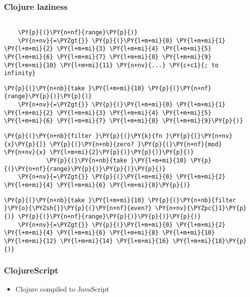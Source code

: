 \begin{frame}[fragile]
  \frametitle{Clojure laziness}
  \begin{Verbatim}[commandchars=\\\{\}]

    \PY{p}{(}\PY{n+nf}{range}\PY{p}{)}
    \PY{n+nv}{=\PYZgt{}} \PY{p}{(}\PY{l+m+mi}{0} \PY{l+m+mi}{1} \PY{l+m+mi}{2} \PY{l+m+mi}{3} \PY{l+m+mi}{4} \PY{l+m+mi}{5} \PY{l+m+mi}{6} \PY{l+m+mi}{7} \PY{l+m+mi}{8} \PY{l+m+mi}{9} \PY{l+m+mi}{10} \PY{l+m+mi}{11} \PY{n+nv}{...} \PY{c+c1}{; to infinity}
  \end{Verbatim}

  \pause

  \begin{Verbatim}[commandchars=\\\{\}]
    \PY{p}{(}\PY{n+nb}{take }\PY{l+m+mi}{10} \PY{p}{(}\PY{n+nf}{range}\PY{p}{)}\PY{p}{)}
    \PY{n+nv}{=\PYZgt{}} \PY{p}{(}\PY{l+m+mi}{0} \PY{l+m+mi}{1} \PY{l+m+mi}{2} \PY{l+m+mi}{3} \PY{l+m+mi}{4} \PY{l+m+mi}{5} \PY{l+m+mi}{6} \PY{l+m+mi}{7} \PY{l+m+mi}{8} \PY{l+m+mi}{9}\PY{p}{)}
  \end{Verbatim}

  \pause

  \begin{Verbatim}[commandchars=\\\{\}]
    \PY{p}{(}\PY{n+nb}{filter }\PY{p}{(}\PY{k}{fn }\PY{p}{[}\PY{n+nv}{x}\PY{p}{]} \PY{p}{(}\PY{n+nb}{zero? }\PY{p}{(}\PY{n+nf}{mod} \PY{n+nv}{x} \PY{l+m+mi}{2}\PY{p}{)}\PY{p}{)}\PY{p}{)}
            \PY{p}{(}\PY{n+nb}{take }\PY{l+m+mi}{10} \PY{p}{(}\PY{n+nf}{range}\PY{p}{)}\PY{p}{)}\PY{p}{)}
    \PY{n+nv}{=\PYZgt{}} \PY{p}{(}\PY{l+m+mi}{0} \PY{l+m+mi}{2} \PY{l+m+mi}{4} \PY{l+m+mi}{6} \PY{l+m+mi}{8}\PY{p}{)}
  \end{Verbatim}

  \pause

  \begin{Verbatim}[commandchars=\\\{\}]
    \PY{p}{(}\PY{n+nb}{take }\PY{l+m+mi}{10} \PY{p}{(}\PY{n+nb}{filter }\PY{o}{\PYZsh{}}\PY{p}{(}\PY{n+nf}{even?} \PY{n+nv}{\PYZpc{}1}\PY{p}{)} \PY{p}{(}\PY{n+nf}{range}\PY{p}{)}\PY{p}{)}\PY{p}{)}
    \PY{n+nv}{=\PYZgt{}} \PY{p}{(}\PY{l+m+mi}{0} \PY{l+m+mi}{2} \PY{l+m+mi}{4} \PY{l+m+mi}{6} \PY{l+m+mi}{8} \PY{l+m+mi}{10} \PY{l+m+mi}{12} \PY{l+m+mi}{14} \PY{l+m+mi}{16} \PY{l+m+mi}{18}\PY{p}{)}
  \end{Verbatim}
\end{frame}


\begin{frame}
  \frametitle{ClojureScript}

  \begin{itemize}
  \item<1-> Clojure compiled to JavaScript
  \end{itemize}


\end{frame}
